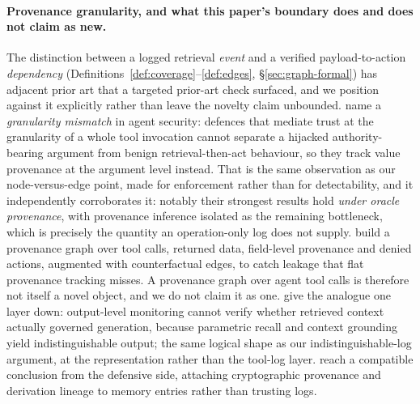 \documentclass{article}
\begin{document}
\paragraph{Provenance granularity, and what this paper's boundary does and does not claim as new.} The distinction between a logged retrieval \emph{event} and a verified payload-to-action \emph{dependency} (Definitions~\ref{def:coverage}--\ref{def:edges}, \S\ref{sec:graph-formal}) has adjacent prior art that a targeted prior-art check surfaced, and we position against it explicitly rather than leave the novelty claim unbounded. \citet{fan2026pact} name a \emph{granularity mismatch} in agent security: defences that mediate trust at the granularity of a whole tool invocation cannot separate a hijacked authority-bearing argument from benign retrieval-then-act behaviour, so they track value provenance at the argument level instead. That is the same observation as our node-versus-edge point, made for enforcement rather than for detectability, and it independently corroborates it: notably their strongest results hold \emph{under oracle provenance}, with provenance inference isolated as the remaining bottleneck, which is precisely the quantity an operation-only log does not supply. \citet{chinaei2026laundering} build a provenance graph over tool calls, returned data, field-level provenance and denied actions, augmented with counterfactual edges, to catch leakage that flat provenance tracking misses. A provenance graph over agent tool calls is therefore not itself a novel object, and we do not claim it as one. \citet{yu2026attribution} give the analogue one layer down: output-level monitoring cannot verify whether retrieved context actually governed generation, because parametric recall and context grounding yield indistinguishable output; the same logical shape as our indistinguishable-log argument, at the representation rather than the tool-log layer. \citet{ouyang2026memlineage} reach a compatible conclusion from the defensive side, attaching cryptographic provenance and derivation lineage to memory entries rather than trusting logs.
\end{document}
